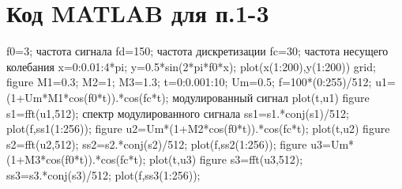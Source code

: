 \documentclass[10pt,a4paper]{report}
\begin{document}
 \chapter{Код MATLAB для п.1-3}
f0=3; частота сигнала \newline
fd=150; частота дискретизации\newline
fc=30; частота несущего колебания\newline
x=0:0.01:4*pi;\newline
y=0.5*sin(2*pi*f0*x);\newline
plot(x(1:200),y(1:200))\newline
grid;\newline
figure\newline
M1=0.3; \newline
M2=1;\newline
M3=1.3;\newline
t=0:0.001:10;\newline
Um=0.5;\newline
f=100*(0:255)/512;\newline
u1=(1+Um*M1*cos(f0*t)).*cos(fc*t); модулированный сигнал\newline
plot(t,u1)\newline
figure\newline
s1=fft(u1,512); спектр модулированного сигнала\newline
ss1=s1.*conj(s1)/512;\newline
plot(f,ss1(1:256));\newline
figure\newline
u2=Um*(1+M2*cos(f0*t)).*cos(fc*t);\newline
plot(t,u2)\newline
figure\newline
s2=fft(u2,512);\newline
ss2=s2.*conj(s2)/512;\newline
plot(f,ss2(1:256));\newline
figure\newline
u3=Um*(1+M3*cos(f0*t)).*cos(fc*t);\newline
plot(t,u3)\newline
figure\newline
s3=fft(u3,512);\newline
ss3=s3.*conj(s3)/512;\newline
plot(f,ss3(1:256));\newline
\end{document}
